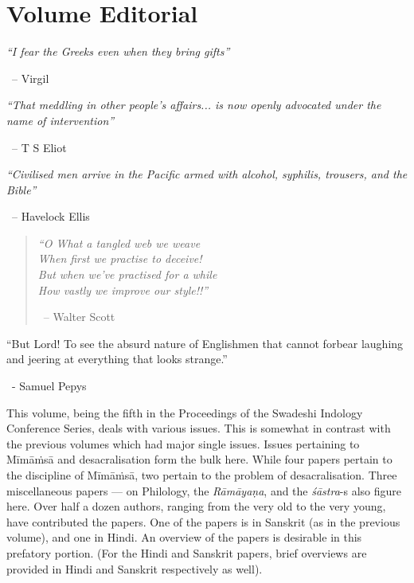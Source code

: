 \chapter*{Volume Editorial}\label{volumeeditorial}

\begin{myquote}
\textit{“I fear the Greeks even when they bring gifts”} 

~\hfill – Virgil
\end{myquote}

\begin{myquote}
\textit{“That meddling in other people’s affairs... is now openly advocated under the name of intervention”} 

~\hfill – T S Eliot
\end{myquote}

\begin{myquote}
\textit{“Civilised men arrive in the Pacific armed with alcohol, syphilis, trousers, and the Bible”} 

~\hfill – Havelock Ellis
\end{myquote}

\begin{verse}
\textit{“O What a tangled web we weave\\ When first we practise to deceive!\\ But when we’ve practised for a while\\ How vastly we improve our style!!”} 

~\hfill – Walter Scott
\end{verse}

\begin{myquote}
“But Lord! To see the absurd nature of Englishmen that cannot forbear laughing and jeering at everything that looks strange.” 

~\hfill - Samuel Pepys
\end{myquote}

This volume, being the fifth in the Proceedings of the Swadeshi Indology Conference Series, deals with various issues. This is somewhat in contrast with the previous volumes which had major single issues. Issues pertaining to Mīmāṁsā and desacralisation form the bulk here. While four papers pertain to the discipline of Mīmāṁsā, two pertain to the problem of desacralisation. Three miscellaneous papers — on Philology,
 the \textit{Rāmāyaṇa}, and the \textit{śāstra}-s also figure here. Over half a dozen authors, ranging from the very old to the very young, have contributed the papers. One of the papers is in Sanskrit (as in the previous volume), and one in Hindi. An overview of the papers is desirable in this prefatory portion. (For the Hindi and Sanskrit papers, brief overviews are provided in Hindi and Sanskrit respectively as well).

